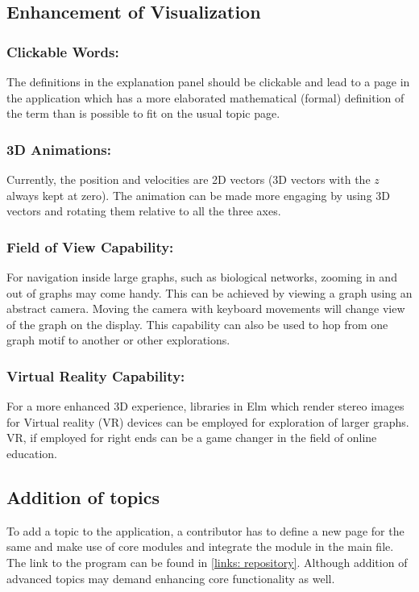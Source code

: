 \subsection{Enhancement of Visualization}

\subsubsection{Clickable Words:} The definitions in the explanation panel
should be clickable and lead to a page in the application which has a more
elaborated mathematical (formal) definition of the term than is possible to fit
on the usual topic page.

\subsubsection{3D Animations:} Currently, the position and velocities are 2D
vectors (3D vectors with the $z$ always kept at zero). The animation can be
made more engaging by using 3D vectors and rotating them relative to all the
three axes.

\subsubsection{Field of View Capability:} 
For navigation inside large graphs, such as biological networks, zooming in
and out of graphs may come handy. This can be achieved by viewing a graph using
an abstract camera. Moving the camera with keyboard movements will change view
of the graph on the display. This capability can also be used to hop from one
graph motif to another or other explorations.

\subsubsection{Virtual Reality Capability:}
For a more enhanced 3D experience, libraries in Elm which render stereo images
for Virtual reality (VR) devices can be employed for exploration of larger
graphs. VR, if employed for right ends can be a game changer in the field of
online education.

\subsection{Addition of topics}
To add a topic to the application, a contributor has to define a new page for
the same and make use of core modules and integrate the module in the main
file. The link to the program can be found in \autoref{links: repository}.
Although addition of advanced topics may demand enhancing core functionality as
well.

